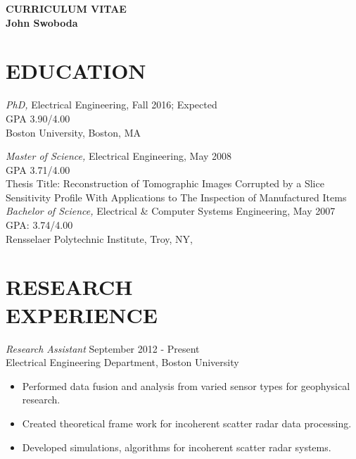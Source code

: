 
\thispagestyle{empty}

\begin{center}
{\LARGE {\bf CURRICULUM VITAE}}\\
\vspace{0.5in}
{\large {\bf John Swoboda}}
\end{center}

\section*{EDUCATION}{\sl PhD,} Electrical Engineering, Fall 2016; Expected \\
                GPA 3.90/4.00 \\
                Boston University, Boston, MA
	       

{\sl Master of Science,} Electrical Engineering, May 2008 \\
                 GPA 3.71/4.00\\
                Thesis Title: Reconstruction of Tomographic Images Corrupted by a Slice Sensitivity Profile With Applications to The Inspection of Manufactured Items\\
 {\sl Bachelor of Science,} Electrical \& Computer Systems Engineering, May 2007  \\
                GPA: 3.74/4.00\\
                Rensselaer Polytechnic Institute, Troy, NY, \\
                
 
 

 
\section*{RESEARCH \\ EXPERIENCE}
 {\sl Research Assistant} \hfill            September 2012 - Present \\
                Electrical Engineering Department, Boston University 
                 \begin{itemize}  \itemsep -2pt %
                 \item Performed data fusion and analysis from varied sensor types for geophysical research.
                 \item Created theoretical frame work for incoherent scatter radar data processing.
                 \item Developed simulations, algorithms for incoherent scatter radar systems.
                 \end{itemize} 

